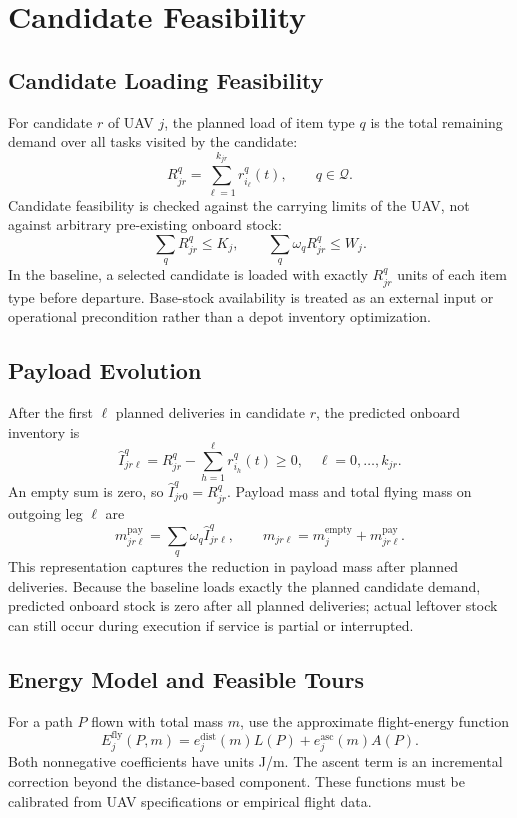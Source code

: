\documentclass[conference]{IEEEtran}
\begin{document}
\section{Candidate Feasibility}
\subsection{Candidate Loading Feasibility}
For candidate $r$ of UAV $j$, the planned load of item type $q$ is the total remaining demand over all tasks visited by the candidate:
\begin{equation}
R_{jr}^q=\sum_{\ell=1}^{k_{jr}}r_{i_\ell}^q(t),
\qquad q\in\mathcal Q.
\end{equation}
Candidate feasibility is checked against the carrying limits of the UAV, not against arbitrary pre-existing onboard stock:
\begin{equation}
\sum_q R_{jr}^q\leq K_j,\qquad
\sum_q \omega_qR_{jr}^q\leq W_j.
\end{equation}
In the baseline, a selected candidate is loaded with exactly $R_{jr}^q$ units of each item type before departure. Base-stock availability is treated as an external input or operational precondition rather than a depot inventory optimization.

\subsection{Payload Evolution}
After the first $\ell$ planned deliveries in candidate $r$, the predicted onboard inventory is
\begin{equation}
\widehat I_{jr\ell}^q=R_{jr}^q-\sum_{h=1}^{\ell}r_{i_h}^q(t)\geq0,
\quad \ell=0,\ldots,k_{jr}.
\end{equation}
An empty sum is zero, so $\widehat I_{jr0}^q=R_{jr}^q$. Payload mass and total flying mass on outgoing leg $\ell$ are
\begin{equation}
m_{jr\ell}^{\mathrm{pay}}=\sum_q \omega_q\widehat I_{jr\ell}^q,\qquad
m_{jr\ell}=m_j^{\mathrm{empty}}+m_{jr\ell}^{\mathrm{pay}}.
\end{equation}
This representation captures the reduction in payload mass after planned deliveries. Because the baseline loads exactly the planned candidate demand, predicted onboard stock is zero after all planned deliveries; actual leftover stock can still occur during execution if service is partial or interrupted.

\subsection{Energy Model and Feasible Tours}
For a path $P$ flown with total mass $m$, use the approximate flight-energy function
\begin{equation}
E_j^{\mathrm{fly}}(P,m)
=e_j^{\mathrm{dist}}(m)L(P)+e_j^{\mathrm{asc}}(m)A(P).
\end{equation}
Both nonnegative coefficients have units J/m. The ascent term is an incremental correction beyond the distance-based component. These functions must be calibrated from UAV specifications or empirical flight data.
\end{document}
